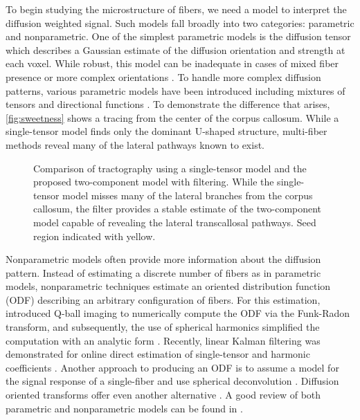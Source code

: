 \documentclass[letterpaper,hyperref,12pt]{gatech-thesis}
\newcommand{\citet}[1]{\cite{#1}} %
\begin{document}
To begin studying the microstructure of fibers, we need a model to interpret
the diffusion weighted signal.  Such models fall broadly into two categories:
parametric and nonparametric.
%
One of the simplest parametric models is the diffusion tensor which describes
a Gaussian estimate of the diffusion orientation and strength at each voxel.
While robust, this model can be inadequate in cases of mixed fiber presence or
more complex orientations \cite{Alexander2002,Frank2002}.
%
To handle more complex diffusion patterns, various parametric models have been
introduced including mixtures of tensors
\cite{Alexander2001,Tuch2002,Parker2005,Kreher2005,Peled2006} and directional
functions \cite{McGraw2006,Kaden2007,Rathi2009mia_w}.  To demonstrate the
difference that arises, \autoref{fig:sweetness} shows a tracing from the
center of the corpus callosum.  While a single-tensor model finds only the
dominant U-shaped structure, multi-fiber methods reveal many of the lateral
pathways known to exist.

\begin{figure}[t]
  \centering
  \caption{Comparison of tractography using a single-tensor model and the
    proposed two-component model with filtering.  While the single-tensor
    model misses many of the lateral branches from the corpus callosum, the
    filter provides a stable estimate of the two-component model capable of
    revealing the lateral transcallosal pathways.  Seed region indicated with
    yellow.}
  \label{fig:sweetness}
\end{figure}
Nonparametric models often provide more information about the diffusion
pattern.  Instead of estimating a discrete number of fibers as in parametric
models, nonparametric techniques estimate an oriented distribution function
(ODF) describing an arbitrary configuration of fibers.
%
For this estimation, \citet{Tuch2004} introduced Q-ball imaging to numerically
compute the ODF via the Funk-Radon transform, and subsequently, the use of
spherical harmonics simplified the computation with an analytic form
\cite{Anderson2005,Hess2006,Descoteaux2007mrm}.  Recently, linear Kalman
filtering was demonstrated for online direct estimation of single-tensor and
harmonic coefficients \cite{Poupon2008,Deriche2009}.
%
Another approach to producing an ODF is to assume a model for the signal
response of a single-fiber and use spherical deconvolution
\cite{Jian2007dot,Jansons2003,Tournier2004,Kaden2007,Kumar2008}.  Diffusion
oriented transforms offer even another alternative \cite{Ozarslan2006}.  A
good review of both parametric and nonparametric models can be found in
\cite{Alexander2005nyas,Descoteaux2007}.
\end{document}
